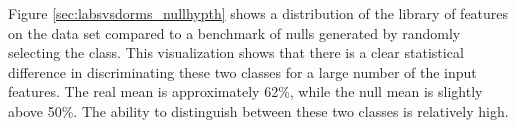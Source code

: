 Figure \ref{sec:labsvsdorms_nullhypth} shows a distribution of the library of features on the data set compared to a benchmark of nulls generated by randomly selecting the class. This visualization shows that there is a clear statistical difference in discriminating these two classes for a large number of the input features. The real mean is approximately 62\%, while the null mean is slightly above 50\%. The ability to distinguish between these two classes is relatively high.